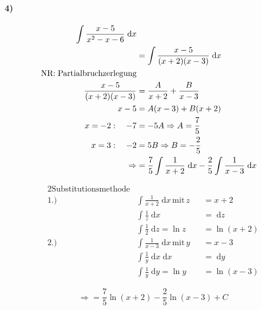 \paragraph{4)}

\begin{align*}
	\int \frac{x-5}{x^2 - x - 6} \;\mathrm{d}x                                                                             \\
	                       & = \int \frac{x-5}{(x+2)(x-3)} \;\mathrm{d}x                                                   \\
	\text{NR:\;Partialbruchzerlegung}                                                                                      \\
	\frac{x-5}{(x+2)(x-3)} & = \frac{A}{x+2} + \frac{B}{x-3}                                                               \\
	x-5                    & = A(x-3) + B(x+2)                                                                             \\
	x=-2:\quad -7          & = -5A \Rightarrow A = \frac{7}{5}                                                             \\
	x=3:\quad -2           & = 5B \Rightarrow B = -\frac{2}{5}                                                             \\
	\Rightarrow            & = \frac{7}{5} \int \frac{1}{x+2} \;\mathrm{d}x - \frac{2}{5} \int \frac{1}{x-3} \;\mathrm{d}x
\end{align*}


\begin{alignat*}{2}
	\text{Substitutionsmethode}                                                              \\
	\text{1.)}\quad & \int \frac{1}{x+2} \;\mathrm{d}x \,\text{mit}\, z &  & = x + 2         \\
	                & \int \frac{1}{z} \;\mathrm{d}x                    &  & = \;\mathrm{d}z \\
	                & \int \frac{1}{2} \;\mathrm{d}z = \ln z            &  & = \ln (x + 2)   \\
	\text{2.)}\quad & \int \frac{1}{x-3} \;\mathrm{d}x \,\text{mit}\, y &  & = x - 3         \\
	                & \int \frac{1}{y} \;\mathrm{d}x \;\mathrm{d}x      &  & = \;\mathrm{d}y \\
	                & \int \frac{1}{y} \;\mathrm{d}y = \ln y            &  & = \ln(x-3)
\end{alignat*}

\[
	\Rightarrow = \frac{7}{5} \ln(x+2) - \frac{2}{5} \ln(x-3) + C
\]
